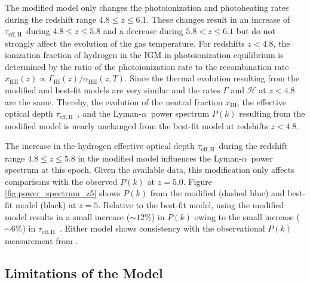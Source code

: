 \documentclass[twocolumn]{aastex62}
\newcommand\Lya{Lyman-$\alpha$}
\newcommand\taueffH{$\tau_{\mathrm{eff,H}}$~}
\begin{document}
The modified model only changes the photoionization and photoheating rates during the redshift range $4.8 \leq z \leq 6.1$.
These changes result
in an increase of \taueffH during $4.8 \leq z \leq 5.8$ and a decrease during $5.8 < z \leq 6.1$ but do not strongly affect
the evolution of the gas temperature. For redshifts $ z < 4.8$,
the ionization fraction of 
hydrogen in the IGM in photoionization equilibrium is determined by the ratio of the photoionization rate to the recombination rate 
$x_\mathrm{HII}(z) \propto \Gamma_\mathrm{HI}(z) / \alpha_\mathrm{HII}(z,T)$. 
Since the thermal evolution resulting from the modified 
and best-fit models are very similar and the rates $\Gamma$ and $\mathcal{H}$ at  $ z < 4.8$ are the same. Thereby, 
the evolution of the neutral fraction $x_\mathrm{HI}$,
the effective optical depth \taueffH, and the \Lya\ power spectrum $P(k)$ resulting from the 
modified model is nearly unchanged from the best-fit model at redshifts $z < 4.8$.                   

The increase in the hydrogen effective optical depth \taueffH during 
the redshift range $4.8 \leq z \leq 5.8$ in the modified model influences the \Lya\ 
power spectrum at this epoch.
Given the available data, this modification
only affects comparisons with the observed $P(k)$ at $z=5.0$.
Figure
\ref{fig:power_spectrum_z5} shows $P(k)$ from the modified (dashed blue) and best-fit model (black) at $z=5$.
Relative to the best-fit model, using the modified model results in a small
increase ($\sim 12\%$) in $P(k)$ owing to the small increase ($\sim 6\%$) in \taueffH. 
Either model shows consistency with the observational $P(k)$ measurement from \cite{boera2019a}.




\subsection{Limitations of the Model }\label{sec:limitations}
\end{document}
